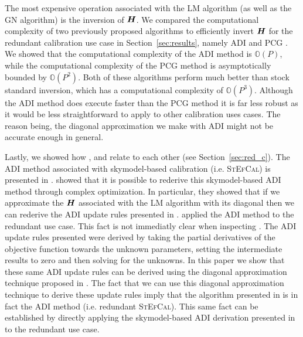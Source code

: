 \documentclass[useAMS,usenatbib]{mn2e}
\newcommand{\bH}{\bmath{H}}
\begin{document}
The most expensive operation associated with the LM algorithm (as well as the GN algorithm) is the inversion of $\bH$.
We compared the computational complexity of two previously proposed algorithms to efficiently invert $\bH$ for the redundant calibration use case in Section~\ref{sec:results}, namely 
ADI \citep{Marthi2014} and PCG \citep{Liu2010}. We showed that the computational complexity of the ADI method is $\mathbb{O}(P)$, while the computational complexity of the PCG method is asymptotically bounded
by $\mathbb{O}(P^2)$. Both of these algorithms perform much better than stock standard inversion, which has a computational complexity of $\mathbb{O}(P^3)$.
Although the ADI method does execute faster than the PCG method it is far less robust as it would be less straightforward to apply to other calibration uses cases. The reason being,
the diagonal approximation we make with ADI might not be accurate enough in general.

Lastly, we showed how \citet{Marthi2014}, \citet{Salvini2014} and \citet{Smirnov2015} relate to each other (see Section~\ref{sec:red_c}). The ADI method associated with skymodel-based calibration (i.e. \textsc{StEfCal}) is presented
in \citet{Salvini2014}. \citet{Smirnov2015} showed that it is possible to rederive this skymodel-based ADI method through complex optimization. In particular, they showed that if 
we approximate the $\bH$ associated with the LM algorithm with its diagonal then we can rederive the ADI update rules presented in \citet{Salvini2014}. 
\citet{Marthi2014} applied the ADI method to the redundant use case. This fact is not immediatly clear when inspecting \citet{Marthi2014}. The ADI update rules presented \citet{Marthi2014} were derived by taking the partial derivatives of 
the objective function towards the unknown parameters, setting the intermediate results to zero and then solving for the unknowns. In this paper we show that 
these same ADI update rules can be derived using the diagonal approximation technique proposed in \citet{Smirnov2015}. The fact that we can use this diagonal approximation
technique to derive these update rules imply that the algorithm presented in \citet{Marthi2014} is in fact the ADI method (i.e. redundant \textsc{StEfCal}). This same
fact can be established by directly applying the skymodel-based ADI derivation presented in \citet{Salvini2014} to the redundant use case.
\end{document}

